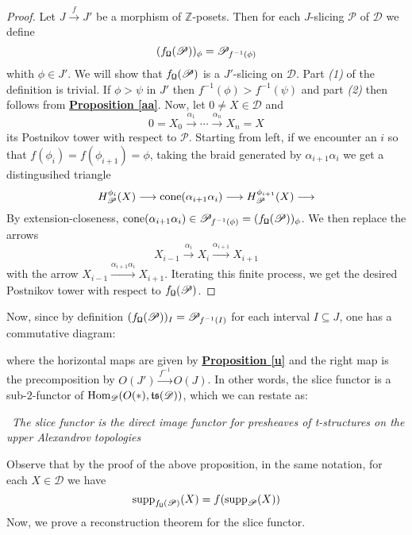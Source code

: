 \begin{proof}
Let $J \overset{f}{\longrightarrow} J'$ be a morphism of $\mathbb{Z}$-posets. Then for each $J$-slicing $\mathscr{P}$ of $\mathscr{D}$ we define $$(f_{\textnormal{\Libra}}(\mathscr{P}))_{\phi}= \mathscr{P}_{f^{-1}(\phi)}$$
whith $\phi \in J'$. We will show that $f_{\textnormal{\Libra}}(\mathscr{P})$ is a $J'$-slicing on $\mathscr{D}$. Part \textit{(1)} of the definition is trivial. If $\phi > \psi$ in $J'$ then $f^{-1}(\phi) > f^{-1}(\psi)$ and part \textit{(2)} then follows from \hyperref[aa]{\textbf{Proposition \ref*{aa}}}. Now, let $0 \not = X \in \mathscr{D}$ and $$0=X_0 \overset{\alpha_1}{\longrightarrow} \cdots \overset{\alpha_n}{\longrightarrow} X_n=X$$
its Postnikov tower with respect to $\mathscr{P}$. Starting from left, if we encounter an $i$ so that $f(\phi_i)=f(\phi_{i+1})=\phi$, taking the braid generated by $\alpha_{i+1} \alpha_i$ we get a distingusihed triangle $$H^{\phi_i}_{\mathscr{P}}(X) \longrightarrow \textnormal{cone}(\alpha_{i+1} \alpha_i) \longrightarrow H^{\phi_{i+1}}_{\mathscr{P}}(X) \longrightarrow $$ By extension-closeness, $\textnormal{cone}(\alpha_{i+1} \alpha_i) \in \mathscr{P}_{f^{-1}(\phi)}=(f_{\textnormal{\Libra}}(\mathscr{P}))_{\phi}$. We then replace the arrows $$X_{i-1} \overset{\alpha_i}{\longrightarrow} X_i \overset{\alpha_{i+1}}{\longrightarrow} X_{i+1}$$ with the arrow $X_{i-1} \overset{\alpha_{i+1} \alpha_i}{\longrightarrow} X_{i+1}$. Iterating this finite process, we get the desired Postnikov tower with respect to $f_{\textnormal{\Libra}}(\mathscr{P})$. 
\end{proof}

Now, since by definition $(f_{\textnormal{\Libra}}(\mathscr{P}))_I=\mathscr{P}_{f^{-1}(I)}$ for each interval $I \subseteq J$, one has a commutative diagram: 
\begin{center}
\end{center}
where the horizontal maps are given by \hyperref[u]{\textbf{Proposition \ref*{u}}} and the right map is the precomposition by $O(J') \overset{f^{-1}}{\longrightarrow} O(J)$. In other words, the slice functor is a sub-$2$-functor of  $\textnormal{Hom}_{\mathscr{D}}(O(*), \mathfrak{ts}(\mathscr{D}))$, which we can restate as:
\begin{center} 
\twonotes \ \textit{The slice functor is the direct image functor for presheaves of t-structures on the upper Alexandrov topologies}
\end{center}
Observe that by the proof of the above proposition, in the same notation, for each $X \in \mathscr{D}$ we have $$\textnormal{supp}_{f_{\textnormal{\Libra}}(\mathscr{P})}(X)=f(\textnormal{supp}_{\mathscr{P}}(X))$$
Now, we prove a reconstruction theorem for the slice functor. \\

